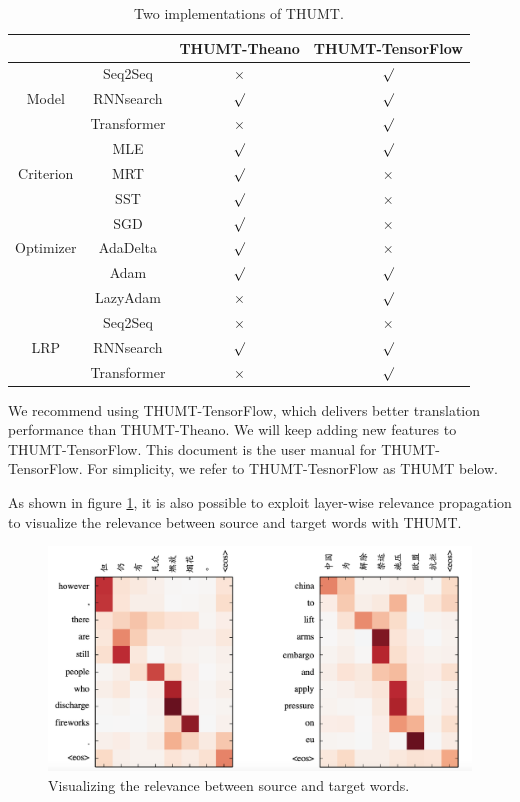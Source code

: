 \documentclass{article}
\begin{document}
\begin{table}[!t]
\centering
\begin{tabular}{|c|c|c|c|}
\cline{3-4}
\multicolumn{2}{c|}{} & THUMT-Theano & THUMT-TensorFlow \\
\hline
 & Seq2Seq &  $\times$ & $\surd$ \\
Model           & RNNsearch & $\surd$ & $\surd$ \\
           & Transformer & $\times$ & $\surd$ \\
\hline
 & MLE & $\surd$ & $\surd$ \\

Criterion               & MRT & $\surd$ & $\times$ \\
               & SST & $\surd$ & $\times$ \\
\hline
 & SGD & $\surd$ & $\times$ \\
Optimizer & AdaDelta & $\surd$ & $\times$ \\
 & Adam & $\surd$ & $\surd$ \\
 & LazyAdam & $\times$ & $\surd$ \\ 
\hline
  & Seq2Seq & $\times$ & $\times$ \\
LRP        & RNNsearch & $\surd$ & $\surd$ \\
        & Transformer & $\times$ & $\surd$ \\
\hline
\end{tabular}
\caption{Two implementations of THUMT.} \label{table:1:implementation}
\end{table}

We recommend using THUMT-TensorFlow, which delivers better translation performance than THUMT-Theano. We will keep adding new features to THUMT-TensorFlow. This document is the user manual for THUMT-TensorFlow. For simplicity, we refer to THUMT-TesnorFlow as THUMT below.

As shown in figure \ref{fig:visualization}, it is also possible to exploit layer-wise relevance propagation \cite{Ding:17} to visualize the relevance between source and target words with THUMT. 

\begin{figure}[h]
    \centering
    \includegraphics[width=1\textwidth]{fig/vis_transformer.png}
    \caption{Visualizing the relevance between source and target words.}
    \label{fig:visualization}
\end{figure}
\end{document}

